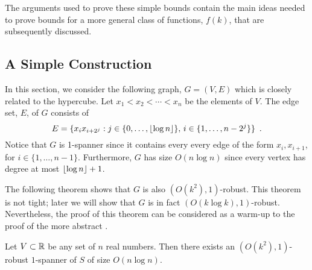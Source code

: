 \documentclass{patmorin}
\begin{document}
The arguments used to prove these simple bounds contain the main ideas
needed to prove bounds for a more general class of functions, $f(k)$,
that are subsequently discussed.

\subsection{A Simple Construction}

In this section, we consider the following graph, $G=(V,E)$ which is
closely related to the hypercube.  Let $x_1<x_2<\cdots<x_n$ be the
elements of $V$. The edge set, $E$, of $G$ consists of
\[
    E = \{x_ix_{i+2^j} : j\in\{0,\ldots,{\lfloor \log n \rfloor}\},\, i\in\{1,\ldots,n-2^j\} \} \enspace .
\] 
Notice that $G$ is 1-spanner since it contains every every edge of the
form $x_i,x_{i+1}$, for $i\in\{1,\ldots,n-1\}$. Furthermore, $G$ has size
$O(n\log n)$ since every vertex has degree at most ${\lfloor \log n \rfloor}+1$.

The following theorem shows that $G$ is also $(O(k^2),1)$-robust.
This theorem is not tight; later we will show that $G$ is in fact
$(O(k\log k),1)$-robust. Nevertheless, the proof of this theorem
can be considered as a warm-up to the proof of the more abstract
.

\begin{thm}
Let $V\subset \mathbb{R}$ be any set of $n$ real numbers.  Then there exists an
$(O(k^2),1)$-robust $1$-spanner of $S$ of size $O(n\log n)$.
\end{thm}
\end{document}
